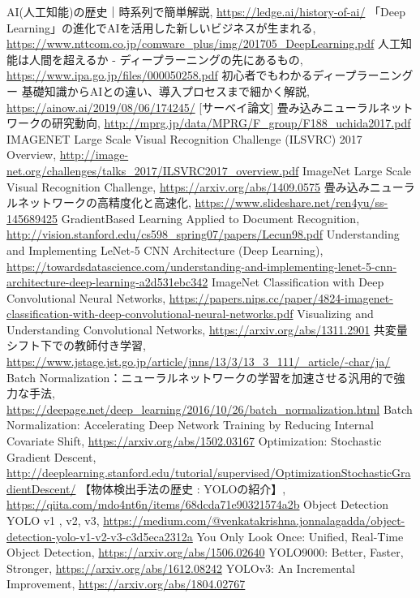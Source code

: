 \documentclass[11pt,a4paper]{jsarticle}
\begin{document}
\begin{thebibliography}{9}
	 AI(人工知能)の歴史｜時系列で簡単解説, \url{https://ledge.ai/history-of-ai/}
	 「Deep Learning」の進化でAIを活用した新しいビジネスが生まれる, \url{https://www.nttcom.co.jp/comware_plus/img/201705_DeepLearning.pdf}
	 人工知能は人間を超えるか - ディープラーニングの先にあるもの, \url{https://www.ipa.go.jp/files/000050258.pdf}
	 初心者でもわかるディープラーニング ー 基礎知識からAIとの違い、導入プロセスまで細かく解説, \url{https://ainow.ai/2019/08/06/174245/}
	 [サーベイ論文] 畳み込みニューラルネットワークの研究動向, \url{http://mprg.jp/data/MPRG/F_group/F188_uchida2017.pdf}
	 IMAGENET Large Scale Visual Recognition Challenge (ILSVRC) 2017 Overview, \url{http://image-net.org/challenges/talks_2017/ILSVRC2017_overview.pdf}
	 ImageNet Large Scale Visual Recognition Challenge, \url{https://arxiv.org/abs/1409.0575}
	 畳み込みニューラルネットワークの高精度化と高速化, \url{https://www.slideshare.net/ren4yu/ss-145689425}
	 GradientBased Learning Applied to Document Recognition, \url{http://vision.stanford.edu/cs598_spring07/papers/Lecun98.pdf}
	 Understanding and Implementing LeNet-5 CNN Architecture (Deep Learning), \url{https://towardsdatascience.com/understanding-and-implementing-lenet-5-cnn-architecture-deep-learning-a2d531ebc342}
	 ImageNet Classification with Deep Convolutional Neural Networks, \url{https://papers.nips.cc/paper/4824-imagenet-classification-with-deep-convolutional-neural-networks.pdf}
	 Visualizing and Understanding Convolutional Networks, \url{https://arxiv.org/abs/1311.2901}
	 共変量シフト下での教師付き学習, \url{https://www.jstage.jst.go.jp/article/jnns/13/3/13_3_111/_article/-char/ja/}
	 Batch Normalization：ニューラルネットワークの学習を加速させる汎用的で強力な手法, \url{https://deepage.net/deep_learning/2016/10/26/batch_normalization.html}
	 Batch Normalization: Accelerating Deep Network Training by Reducing Internal Covariate Shift, \url{https://arxiv.org/abs/1502.03167}
	 Optimization: Stochastic Gradient Descent, \url{http://deeplearning.stanford.edu/tutorial/supervised/OptimizationStochasticGradientDescent/}
	 【物体検出手法の歴史 : YOLOの紹介】, \url{https://qiita.com/mdo4nt6n/items/68dcda71e90321574a2b}
	 Object Detection YOLO v1 , v2, v3, \url{https://medium.com/@venkatakrishna.jonnalagadda/object-detection-yolo-v1-v2-v3-c3d5eca2312a}
	 You Only Look Once: Unified, Real-Time Object Detection, \url{https://arxiv.org/abs/1506.02640}
	 YOLO9000: Better, Faster, Stronger, \url{https://arxiv.org/abs/1612.08242}
	 YOLOv3: An Incremental Improvement, \url{https://arxiv.org/abs/1804.02767}
\end{thebibliography}

%
%
\end{document}
